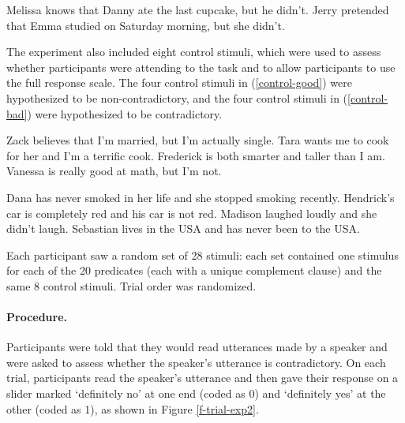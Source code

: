 \documentclass[11pt,fleqn]{article}
\newcommand{\6}{\mbox{$[\hspace*{-.6mm}[$}}
\newcommand{\9}{\mbox{$]\hspace*{-.6mm}]$}}
\begin{document}
\begin{exe}
\ex\label{stims}
\begin{xlist}
 Melissa knows that Danny ate the last cupcake, but he didn't.
 Jerry pretended that Emma studied on Saturday morning, but she didn't.
\end{xlist}
\end{exe}

The experiment also included eight control stimuli, which were used to assess whether participants were attending to the task and to allow participants to use the full response scale. The four control stimuli in (\ref{control-good}) were hypothesized to be non-contradictory, and the four control stimuli in (\ref{control-bad}) were hypothesized to be contradictory.

\begin{exe}
\ex\label{control-good}
\begin{xlist}
\ex Zack believes that I'm married, but I'm actually single.
\ex Tara wants me to cook for her and I'm a terrific cook.
\ex Frederick is both smarter and taller than I am.
\ex Vanessa is really good at math, but I'm not.
\end{xlist}
\ex\label{control-bad}
\begin{xlist}
\ex Dana has never smoked in her life and she stopped smoking recently.
\ex Hendrick's car is completely red and his car is not red.
\ex Madison laughed loudly and she didn't laugh.
\ex Sebastian lives in the USA and has never been to the USA.
\end{xlist}
\end{exe}

Each participant saw a random set of 28 stimuli: each set contained one stimulus for each of the 20 predicates (each with a unique complement clause) and the same 8 control stimuli. Trial order was randomized.


\paragraph{Procedure.} Participants were told that they would read utterances made by a speaker and were asked to assess whether the speaker's utterance is contradictory. On each trial, participants read the speaker's utterance and then gave their response on a slider marked `definitely no' at one end (coded as 0) and `definitely yes' at the other (coded as 1), as shown in Figure \ref{f-trial-exp2}.
\end{document}
